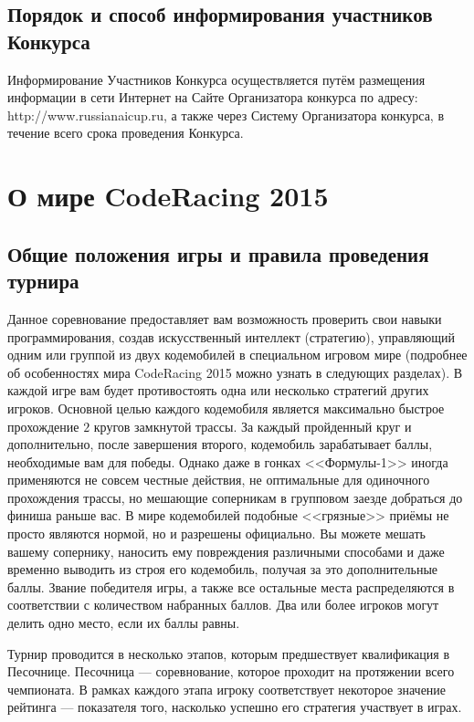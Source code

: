 \section{Порядок и способ информирования участников Конкурса}

Информирование Участников Конкурса осуществляется путём размещения информации в сети Интернет на Сайте Организатора конкурса по адресу:
http://www.russianaicup.ru, а также через Систему Организатора конкурса, в течение всего срока проведения Конкурса.

\chapter{О мире CodeRacing 2015}

\section{Общие положения игры и правила проведения турнира}

Данное соревнование предоставляет вам возможность проверить свои навыки программирования, создав искусственный интеллект (стратегию),
управляющий одним или группой из двух кодемобилей в специальном игровом мире (подробнее об особенностях мира CodeRacing 2015 можно узнать в
следующих разделах). В каждой игре вам будет противостоять одна или несколько стратегий других игроков. Основной целью каждого кодемобиля
является максимально быстрое прохождение $2$ кругов замкнутой трассы. За каждый пройденный круг и дополнительно, после завершения
второго, кодемобиль зарабатывает баллы, необходимые вам для победы. Однако даже в гонках <<Формулы-1>> иногда применяются не совсем
честные действия, не оптимальные для одиночного прохождения трассы, но мешающие соперникам в групповом заезде добраться до финиша раньше
вас. В мире кодемобилей подобные <<грязные>> приёмы не просто являются нормой, но и разрешены официально. Вы можете мешать вашему сопернику,
наносить ему повреждения различными способами и даже временно выводить из строя его кодемобиль, получая за это дополнительные баллы. Звание
победителя игры, а также все остальные места распределяются в соответствии с количеством набранных баллов. Два или более игроков могут
делить одно место, если их баллы равны.

Турнир проводится в несколько этапов, которым предшествует квалификация в Песочнице. Песочница --- соревнование, которое проходит на
протяжении всего чемпионата. В рамках каждого этапа игроку соответствует некоторое значение рейтинга --- показателя того, насколько успешно
его стратегия участвует в играх.

